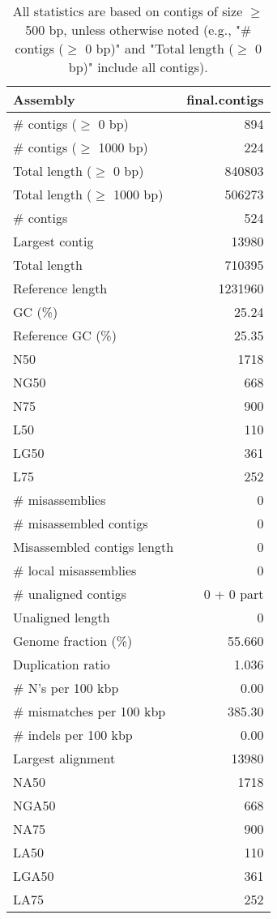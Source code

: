 \documentclass[12pt,a4paper]{article}
\begin{document}
\begin{table}[ht]
\begin{center}
\caption{All statistics are based on contigs of size $\geq$ 500 bp, unless otherwise noted (e.g., "\# contigs ($\geq$ 0 bp)" and "Total length ($\geq$ 0 bp)" include all contigs).}
\begin{tabular}{|l*{1}{|r}|}
\hline
Assembly & final.contigs \\ \hline
\# contigs ($\geq$ 0 bp) & 894 \\ \hline
\# contigs ($\geq$ 1000 bp) & 224 \\ \hline
Total length ($\geq$ 0 bp) & 840803 \\ \hline
Total length ($\geq$ 1000 bp) & 506273 \\ \hline
\# contigs & 524 \\ \hline
Largest contig & 13980 \\ \hline
Total length & 710395 \\ \hline
Reference length & 1231960 \\ \hline
GC (\%) & 25.24 \\ \hline
Reference GC (\%) & 25.35 \\ \hline
N50 & 1718 \\ \hline
NG50 & 668 \\ \hline
N75 & 900 \\ \hline
L50 & 110 \\ \hline
LG50 & 361 \\ \hline
L75 & 252 \\ \hline
\# misassemblies & 0 \\ \hline
\# misassembled contigs & 0 \\ \hline
Misassembled contigs length & 0 \\ \hline
\# local misassemblies & 0 \\ \hline
\# unaligned contigs & 0 + 0 part \\ \hline
Unaligned length & 0 \\ \hline
Genome fraction (\%) & 55.660 \\ \hline
Duplication ratio & 1.036 \\ \hline
\# N's per 100 kbp & 0.00 \\ \hline
\# mismatches per 100 kbp & 385.30 \\ \hline
\# indels per 100 kbp & 0.00 \\ \hline
Largest alignment & 13980 \\ \hline
NA50 & 1718 \\ \hline
NGA50 & 668 \\ \hline
NA75 & 900 \\ \hline
LA50 & 110 \\ \hline
LGA50 & 361 \\ \hline
LA75 & 252 \\ \hline
\end{tabular}
\end{center}
\end{table}
\end{document}
